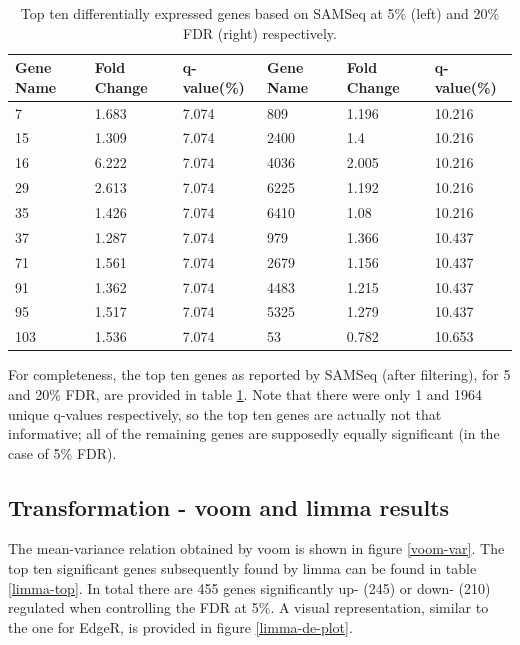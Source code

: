 \documentclass[a4paper,10pt]{article}\usepackage[]{graphicx}\usepackage[]{color}
\begin{document}
\begin{table}[H]
\centering
\caption{Top ten differentially expressed genes based on SAMSeq at 5\% (left) and 20\% FDR (right) respectively.} 
\label{samseq-table}
\begingroup\scriptsize
\begin{tabular}{llllll}
  \hline
Gene Name & Fold Change & q-value(\%) & Gene Name & Fold Change & q-value(\%) \\ 
  \hline
7 & 1.683 & 7.074 & 809 & 1.196 & 10.216 \\ 
  15 & 1.309 & 7.074 & 2400 & 1.4 & 10.216 \\ 
  16 & 6.222 & 7.074 & 4036 & 2.005 & 10.216 \\ 
  29 & 2.613 & 7.074 & 6225 & 1.192 & 10.216 \\ 
  35 & 1.426 & 7.074 & 6410 & 1.08 & 10.216 \\ 
  37 & 1.287 & 7.074 & 979 & 1.366 & 10.437 \\ 
  71 & 1.561 & 7.074 & 2679 & 1.156 & 10.437 \\ 
  91 & 1.362 & 7.074 & 4483 & 1.215 & 10.437 \\ 
  95 & 1.517 & 7.074 & 5325 & 1.279 & 10.437 \\ 
  103 & 1.536 & 7.074 & 53 & 0.782 & 10.653 \\ 
   \hline
\end{tabular}
\endgroup
\end{table}


For completeness, the top ten genes as reported by SAMSeq (after filtering), for 5 and 20\% FDR, are provided in table \ref{samseq-table}. Note that there were only 1 and 1964 unique q-values respectively, so the top ten genes are actually not that informative; all of the remaining genes are supposedly equally significant (in the case of 5\% FDR).

\subsection{Transformation - voom and limma results}



The mean-variance relation obtained by voom is shown in figure \ref{voom-var}. The top ten significant genes subsequently found by limma can be found in table \ref{limma-top}. In total there are 455 genes significantly up- (245) or down- (210) regulated when controlling the FDR at 5\%. A visual representation, similar to the one for EdgeR, is provided in figure \ref{limma-de-plot}.
\end{document}
